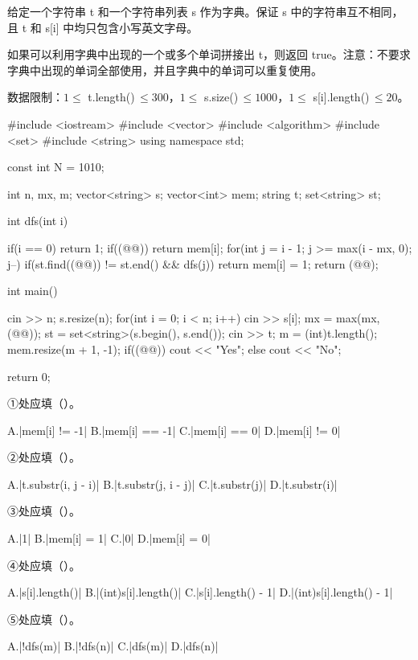 \documentclass{cspexam}
\begin{document}
\hspace*{\Qindent}给定一个字符串 t 和一个字符串列表 s 作为字典。保证 s 中的字符串互不相同，且 t 和 s[i] 中均只包含小写英文字母。

\hspace*{\Qindent}如果可以利用字典中出现的一个或多个单词拼接出 t，则返回 true。注意：不要求字典中出现的单词全部使用，并且字典中的单词可以重复使用。

\hspace*{\Qindent}数据限制：\(1\le\) t.length()\,\(\le 300\)，\(1\le\) s.size()\,\(\le 1000\)，\(1\le\) s[i].length()\,\(\le 20\)。
\begin{ncode}
#include <iostream>
#include <vector>
#include <algorithm>
#include <set>
#include <string>
using namespace std;

const int N = 1010;

int n, mx, m;
vector<string> s;
vector<int> mem;
string t;
set<string> st;

int dfs(int i)
{
    if(i == 0)
        return 1;
    if((@@))
        return mem[i];
    for(int j = i - 1; j >= max(i - mx, 0); j--)
        if(st.find((@@)) != st.end() && dfs(j))
            return mem[i] = 1;
    return (@@);

}

int main()
{
    cin >> n;
    s.resize(n);
    for(int i = 0; i < n; i++)
    {
        cin >> s[i];
        mx = max(mx, (@@));
    }
    st = set<string>(s.begin(), s.end());
    cin >> t;
    m = (int)t.length();
    mem.resize(m + 1, -1);
    if((@@))
        cout << "Yes\n";
    else
        cout << "No\n";

    return 0;
}
\end{ncode}

\Q ①处应填（\quad）。
\begin{optgrid}
\op A.\co|mem[i] != -1|
\op B.\co|mem[i] == -1|
\op C.\co|mem[i] == 0|
\op D.\co|mem[i] != 0|
\end{optgrid}

\Q ②处应填（\quad）。
\begin{optgrid}
\op A.\co|t.substr(i, j - i)|
\op B.\co|t.substr(j, i - j)|
\op C.\co|t.substr(j)|
\op D.\co|t.substr(i)|
\end{optgrid}

\Q ③处应填（\quad）。
\begin{optgrid}
\op A.\co|1|
\op B.\co|mem[i] = 1|
\op C.\co|0|
\op D.\co|mem[i] = 0|
\end{optgrid}

\Q ④处应填（\quad）。
\begin{optgrid}
\op A.\co|s[i].length()|
\op B.\co|(int)s[i].length()|
\op C.\co|s[i].length() - 1|
\op D.\co|(int)s[i].length() - 1|
\end{optgrid}

\Q ⑤处应填（\quad）。
\begin{optrow}
\op A.\co|!dfs(m)| \op B.\co|!dfs(n)| \op C.\co|dfs(m)| \op D.\co|dfs(n)|
\end{optrow}

\answersheet
\end{document}
